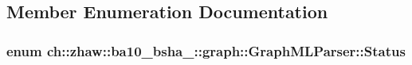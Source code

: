 \subsection{Member Enumeration Documentation}
\hypertarget{classch_1_1zhaw_1_1ba10__bsha__1_1_1graph_1_1GraphMLParser_aaf3d4942a1edfa4a19addb2f2c0cdb9c}{
\subsubsection[{Status}]{\setlength{\rightskip}{0pt plus 5cm}enum {\bf ch::zhaw::ba10\_\-bsha\_::graph::GraphMLParser::Status}}}
\label{classch_1_1zhaw_1_1ba10__bsha__1_1_1graph_1_1GraphMLParser_aaf3d4942a1edfa4a19addb2f2c0cdb9c}
